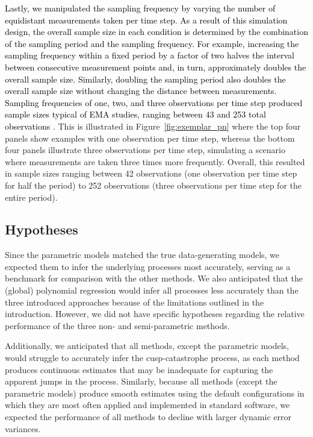 \documentclass[man, floatsintext]{apa7}
\begin{document}
\textcolor{black}{
  Lastly, we manipulated the sampling frequency by varying the number of
  equidistant measurements taken per time step. As a result of this simulation
  design, the overall sample size in each condition is determined by the
  combination of the sampling period and the sampling frequency. For example,
  increasing the sampling frequency within a fixed period by a factor of two
  halves the interval between consecutive measurement points and, in turn,
  approximately doubles the overall sample size. Similarly, doubling the
  sampling period also doubles the overall sample size without changing the
  distance between measurements. Sampling frequencies of one, two, and three
  observations per time step produced sample sizes typical of EMA studies,
  ranging between 43 and 253 total observations
  \parencite{wrzus_ecological_2023}.
} This is illustrated in
Figure~\ref{fig:exemplar_pn} where the top four panels show examples with one
observation per time step, whereas the bottom four panels illustrate three
observations per time step, simulating a scenario where measurements are taken
three times more frequently. Overall, this resulted in sample sizes ranging
between 42 observations (one observation per time step for half the period) to
252 observations (three observations per time step for the entire period).

\subsection{Hypotheses}

Since the parametric models matched the true data-generating models, we
expected them to infer the underlying processes most accurately, serving as a
benchmark for comparison with the other methods. We also anticipated that the
(global) polynomial regression would infer all processes less accurately than
the three introduced approaches because of the limitations outlined in the
introduction. However, we did not have specific hypotheses regarding the
relative performance of the three non- and semi-parametric methods.

Additionally, we anticipated that all methods, except the parametric models,
would struggle to accurately infer the cusp-catastrophe process, as each method
produces continuous estimates that may be inadequate for capturing the apparent
jumps in the process. Similarly, because all methods (except the parametric
models) produce smooth estimates using the default configurations in which they
are most often applied and implemented in standard software, we expected the
performance of all methods to decline with larger dynamic error variances.
\end{document}
